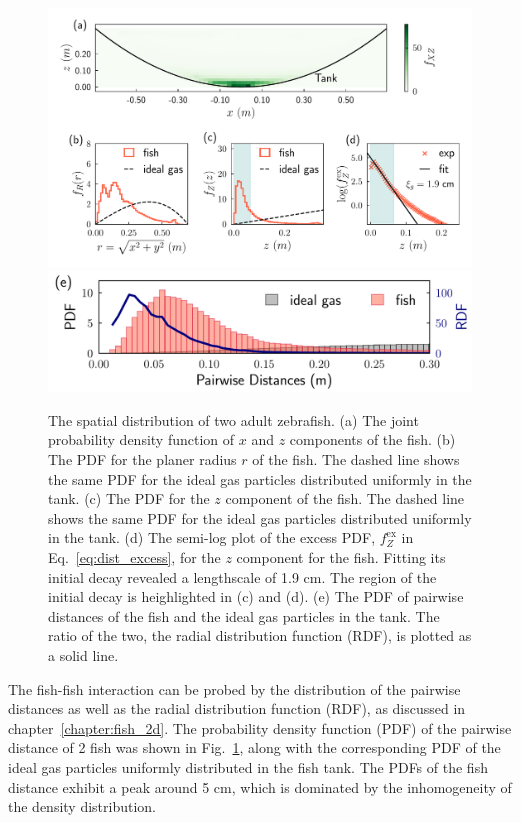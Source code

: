 \documentclass[11pt,twoside]{report}
\begin{document}
\begin{figure}
  \includegraphics[width=\linewidth]{density-two-fish}
  \includegraphics[width=0.9\linewidth, outer]{pdist-2fish}
  \caption[The 3D spatial distribution of two fish]{
  The spatial distribution of two adult zebrafish.
  (a) The joint probability density function of $x$ and $z$ components of the fish.
  (b) The PDF for the planer radius $r$ of the fish. The dashed line shows the same PDF for the ideal gas particles distributed uniformly in the tank.
  (c) The PDF for the $z$ component of the fish. The dashed line shows the same PDF for the ideal gas particles distributed uniformly in the tank.
  (d) The semi-log plot of the excess PDF, $f_Z^\mathrm{ex}$ in Eq.~\ref{eq:dist_excess}, for the $z$ component for the fish. Fitting its initial decay revealed a lengthscale of 1.9 cm. The region of the initial decay is heighlighted in (c) and (d).
  (e) The PDF of pairwise distances of the fish and the ideal gas particles in the tank. The ratio of the two, the radial distribution function (RDF), is plotted as a solid line.
  }
  \label{fig:density_3d_fish_2}
\end{figure}

The fish-fish interaction can be probed by the distribution of the pairwise distances as well as the radial distribution function (RDF), as discussed in chapter~\ref{chapter:fish_2d}. The probability density function (PDF) of the pairwise distance of 2 fish was shown in Fig.~\ref{fig:density_3d_fish_2}, along with the corresponding PDF of the ideal gas particles uniformly distributed in the fish tank. The PDFs of the fish distance exhibit a peak around 5 cm, which is dominated by the inhomogeneity of the density distribution.
\end{document}
